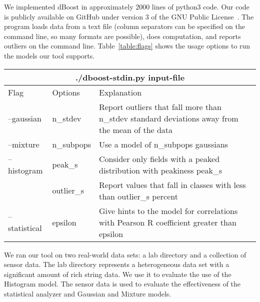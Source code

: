 
We implemented dBoost in approximately 2000 lines of python3 code.
Our code is publicly available on GitHub under version 3 of the GNU Public License~\cite{github}.
The program loads data from a text file (column separators can be specified on the command line, so many formats are possible), does computation, and reports outliers on the command line.
Table~\ref{table:flags} shows the usage options to run the models our tool supports. 

\begin{table*}
\label{table:flags}
\caption{dBoost command line usage.}
\centering
\begin{tabular} {| l | l | p{10cm} |}
\hline
\multicolumn{3}{|c|}{./dboost-stdin.py input-file} \\
\hline
Flag & Options & Explanation \\
\hline
--gaussian & n\_stdev & Report outliers that fall more than n\_stdev standard deviations away from the mean of the data \\
--mixture & n\_subpops & Use a model of n\_subpops gaussians \\
--histogram & peak\_s & Consider only fields with a peaked distribution with peakiness peak\_s \\
  & outlier\_s & Report values that fall in classes with less than outlier\_s percent \\
--statistical & epsilon & Give hints to the model for correlations with Pearson R coefficient greater than epsilon \\
\hline
\end{tabular}
\end{table*}

We ran our tool on two real-world data sets: a lab directory and a collection of sensor data.
The lab directory represents a heterogeneous data set with a significant amount of rich string data.
We use it to evaluate the use of the Histogram model.
The sensor data is used to evaluate the effectiveness of the statistical analyzer and Gaussian and Mixture models.
